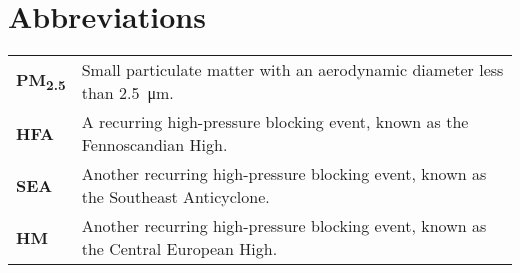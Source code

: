 \section*{Abbreviations}

\begin{tabular}{@{}ll@{}}
    \textbf{PM\textsubscript{2.5}} & Small particulate matter with an aerodynamic diameter less than \SI{2.5}{\micro\metre}. \\[7mm]
    \textbf{HFA} &  A recurring high-pressure blocking event, known as the Fennoscandian High. \\[7mm]
    \textbf{SEA} & Another recurring high-pressure blocking event, known as the Southeast Anticyclone. \\[7mm]
    \textbf{HM}  & Another recurring high-pressure blocking event, known as the Central European High. \\
    \end{tabular}


